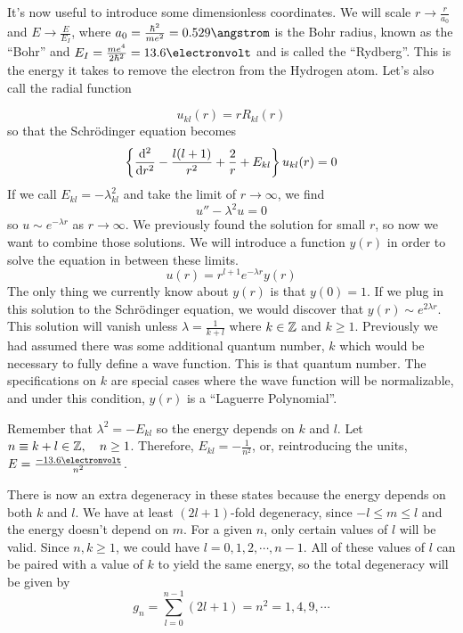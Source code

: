 \documentclass[a4paper,twoside,master.tex]{subfiles}
\begin{document}
It's now useful to introduce some dimensionless coordinates. We will scale $ r \to \frac{r}{a_0} $ and $ E \to \frac{E}{E_I} $, where $ a_0 = \frac{\hbar^2}{me^2} = 0.529\angstrom $ is the Bohr radius, known as the ``Bohr'' and $ E_I = \frac{me^4}{2 \hbar^2} = 13.6\electronvolt $ and is called the ``Rydberg''. This is the energy it takes to remove the electron from the Hydrogen atom. Let's also call the radial function

\begin{equation}
    u_{kl}(r) = r R_{kl}(r)
\end{equation}
so that the Schr\"odinger equation becomes
\begin{equation}
    \left\{ \dv[2]{r} - \frac{l(l+1)}{r^2} + \frac{2}{r} + E_{kl} \right\} u_{kl}(r) = 0
\end{equation}
If we call $ E_{kl} = - \lambda^2_{kl} $ and take the limit of $ r \to \infty $, we find
\begin{equation}
    u'' - \lambda^2 u = 0
\end{equation}
so $ u \sim e^{- \lambda r} $ as $ r \to \infty $.
We previously found the solution for small $ r $, so now we want to combine those solutions. We will introduce a function $ y(r) $ in order to solve the equation in between these limits.
\begin{equation}
    u(r) = r^{l+1} e^{- \lambda r} y(r)
\end{equation}
The only thing we currently know about $ y(r) $ is that $ y(0) = 1 $. If we plug in this solution to the Schr\"odinger equation, we would discover that $ y(r) \sim e^{2 \lambda r} $. This solution will vanish unless $ \lambda = \frac{1}{k+l} $ where $ k \in \mathbb{Z} $ and $ k \geq 1 $. Previously we had assumed there was some additional quantum number, $ k $ which would be necessary to fully define a wave function. This is that quantum number. The specifications on $ k $ are special cases where the wave function will be normalizable, and under this condition, $ y(r) $ is a ``Laguerre Polynomial''.

Remember that $ \lambda^2 = - E_{kl} $ so the energy depends on $ k $ and $ l $. Let $ n \equiv k + l \in \Z \qc n \geq 1 $. Therefore, $ E_{kl} = - \frac{1}{n^2} $, or, reintroducing the units, $ E = \frac{- 13.6\electronvolt}{n^2} $.

There is now an extra degeneracy in these states because the energy depends on both $ k $ and $ l $. We have at least $ (2l+1) $-fold degeneracy, since $ -l \leq m \leq l $ and the energy doesn't depend on $ m $. For a given $ n $, only certain values of $ l $ will be valid. Since $ n, k \geq 1 $, we could have $ l = 0, 1, 2,\cdots,n-1 $. All of these values of $ l $ can be paired with a value of $ k $ to yield the same energy, so the total degeneracy will be given by
\begin{equation}
    g_n = \sum_{l=0}^{n-1} (2l+1) = n^2 = 1,4,9,\cdots
\end{equation}
\end{document}
